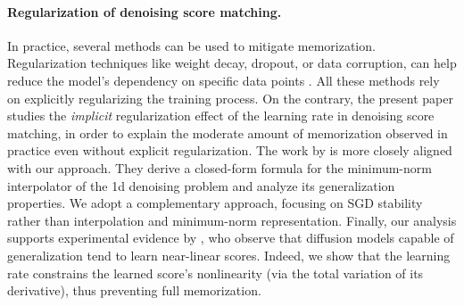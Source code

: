 \paragraph{Regularization of denoising score matching.}
In practice, several methods can be used to mitigate memorization. 
Regularization techniques like weight decay, dropout, or data corruption, can help reduce the model’s dependency on specific data points \citep{daras2024ambient,gu2023memorization}.  All these methods rely on explicitly regularizing the training process. On the contrary, the present paper studies the \textit{implicit} regularization effect of the learning rate in denoising score matching, in order to explain the moderate amount of memorization observed in practice even without explicit regularization. The work by \citet{zeno2024minimum} is more closely aligned with our approach. They derive a closed-form formula for the minimum-norm interpolator of the 1d denoising problem and analyze its generalization properties. We adopt a complementary approach, focusing on SGD stability rather than interpolation and minimum-norm representation. Finally, our analysis supports experimental evidence by \citet{li2024understanding}, who observe that diffusion models capable of generalization tend to learn near-linear scores. Indeed, we show that the learning rate constrains the learned score’s nonlinearity (via the total variation of its derivative), thus preventing full memorization.
